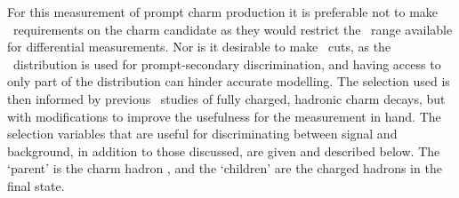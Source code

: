 For this measurement of prompt charm production it is preferable not to make 
\pT\ requirements on the charm candidate as they would restrict the \pT\ range 
available for differential measurements.
Nor is it desirable to make \ipchisq\ cuts, as the \ipchisq\ distribution is 
used for prompt-secondary discrimination, and having access to only part of the 
distribution can hinder accurate modelling.
The selection used is then informed by previous \lhcb\ studies of fully 
charged, hadronic charm decays, but with modifications to improve the 
usefulness for the measurement in hand.
The selection variables that are useful for discriminating between signal and 
background, in addition to those discussed, are given and described below.
The `parent' is the charm hadron \PHc, and the `children' are the charged 
hadrons in the final state.

